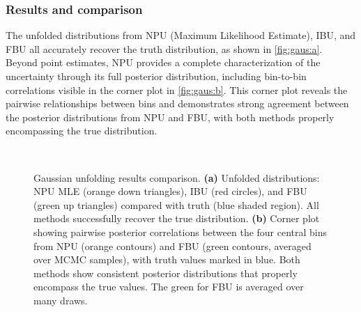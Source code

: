 \subsubsection{Results and comparison}
    The unfolded distributions from NPU (Maximum Likelihood Estimate), IBU, and FBU all accurately recover the truth distribution, as shown in \cref{fig:gaus:a}.
    Beyond point estimates, NPU provides a complete characterization of the uncertainty through its full posterior distribution, including bin-to-bin correlations visible in the corner plot in \cref{fig:gaus:b}.
    This corner plot reveals the pairwise relationships between bins and demonstrates strong agreement between the posterior distributions from NPU and FBU, with both methods properly encompassing the true distribution.
\begin{figure}
\centering
{} 
 \\
\caption[Gaussian unfolding results and posterior analysis]{Gaussian unfolding results comparison.
\textbf{(a)} Unfolded distributions: NPU MLE (orange down triangles), IBU (red circles), and FBU (green up triangles) compared with truth (blue shaded region).
%
All methods successfully recover the true distribution.
%
\textbf{(b)} Corner plot showing pairwise posterior correlations between the four central bins from NPU (orange contours) and FBU (green contours, averaged over MCMC samples), with truth values marked in blue. 
Both methods show consistent posterior distributions that properly encompass the true values.
%
The green for FBU is averaged over many draws.\footnotemark
}
\label{fig:gaus}
\end{figure}

